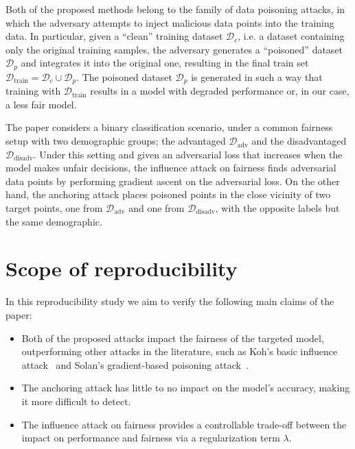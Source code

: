 Both of the proposed methods belong to the family of data poisoning attacks, in which the adversary attempts to inject malicious data points into the training data. In particular, given a ``clean'' training dataset $\mathcal{D}_{c}$, i.e. a dataset containing only the original training samples, the adversary generates a ``poisoned'' dataset $\mathcal{D}_p$ and integrates it into the original one, resulting in the final train set $\mathcal{D}_{\mathrm{train}} = \mathcal{D}_c \cup \mathcal{D}_p$. The poisoned dataset $\mathcal{D}_p$ is generated in such a way that training with $\mathcal{D}_{\mathrm{train}}$ results in a model with degraded performance or, in our case, a less fair model.

The paper considers a binary classification scenario, under a common fairness setup with two demographic groups; the advantaged $\mathcal{D}_{\mathrm{adv}}$ and the disadvantaged $\mathcal{D}_{\mathrm{disadv}}$. Under this setting and given an adversarial loss that increases when the model makes unfair decisions, the influence attack on fairness finds adversarial data points by performing gradient ascent on the adversarial loss. On the other hand, the anchoring attack places poisoned points in the close vicinity of two target points, one from $\mathcal{D}_{\mathrm{adv}}$ and one from $\mathcal{D}_{\mathrm{disadv}}$, with the opposite labels but the same demographic.

\section{Scope of reproducibility}
\label{sec:claims}
In this reproducibility study we aim to verify the following main claims of the paper:
\begin{itemize}
    \item Both of the proposed attacks impact the fairness of the targeted model, outperforming other attacks in the literature, such as Koh's basic influence attack~\cite{koh2018} and Solan's gradient-based poisoning attack~\cite{solans2020poisoning}.
    \item The anchoring attack has little to no impact on the model's accuracy, making it more difficult to detect.
    \item The influence attack on fairness provides a controllable trade-off between the impact on performance and fairness via a regularization term $\lambda$.
\end{itemize}

